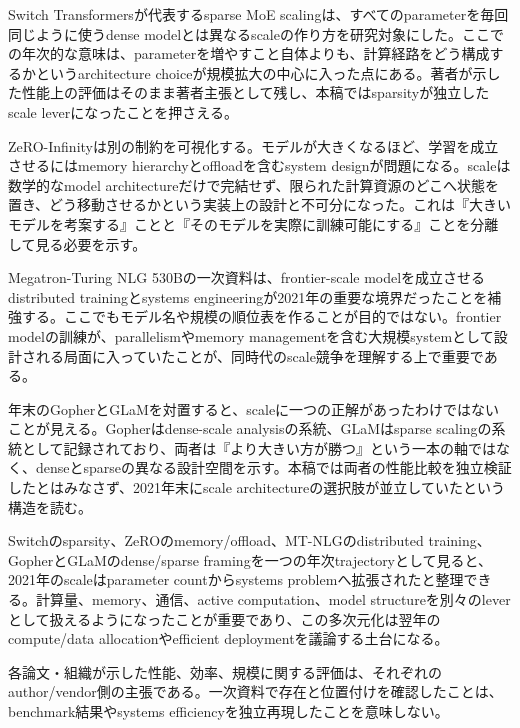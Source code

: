
Switch Transformersが代表するsparse MoE scalingは、すべてのparameterを毎回同じように使うdense modelとは異なるscaleの作り方を研究対象にした。ここでの年次的な意味は、parameterを増やすこと自体よりも、計算経路をどう構成するかというarchitecture choiceが規模拡大の中心に入った点にある。著者が示した性能上の評価はそのまま著者主張として残し、本稿ではsparsityが独立したscale leverになったことを押さえる。\autocite{src-7fa5b597ba1f}


ZeRO-Infinityは別の制約を可視化する。モデルが大きくなるほど、学習を成立させるにはmemory hierarchyとoffloadを含むsystem designが問題になる。scaleは数学的なmodel architectureだけで完結せず、限られた計算資源のどこへ状態を置き、どう移動させるかという実装上の設計と不可分になった。これは『大きいモデルを考案する』ことと『そのモデルを実際に訓練可能にする』ことを分離して見る必要を示す。\autocite{src-7b8be93e524d}


Megatron-Turing NLG 530Bの一次資料は、frontier-scale modelを成立させるdistributed trainingとsystems engineeringが2021年の重要な境界だったことを補強する。ここでもモデル名や規模の順位表を作ることが目的ではない。frontier modelの訓練が、parallelismやmemory managementを含む大規模systemとして設計される局面に入っていたことが、同時代のscale競争を理解する上で重要である。\autocite{src-b307b4b82867}


年末のGopherとGLaMを対置すると、scaleに一つの正解があったわけではないことが見える。Gopherはdense-scale analysisの系統、GLaMはsparse scalingの系統として記録されており、両者は『より大きい方が勝つ』という一本の軸ではなく、denseとsparseの異なる設計空間を示す。本稿では両者の性能比較を独立検証したとはみなさず、2021年末にscale architectureの選択肢が並立していたという構造を読む。\autocite{src-0028da50cfe5,src-7652e568e428,src-d15ca2441916}


Switchのsparsity、ZeROのmemory/offload、MT-NLGのdistributed training、GopherとGLaMのdense/sparse framingを一つの年次trajectoryとして見ると、2021年のscaleはparameter countからsystems problemへ拡張されたと整理できる。計算量、memory、通信、active computation、model structureを別々のleverとして扱えるようになったことが重要であり、この多次元化は翌年のcompute/data allocationやefficient deploymentを議論する土台になる。\autocite{src-0028da50cfe5,src-7652e568e428,src-7b8be93e524d,src-7fa5b597ba1f,src-b307b4b82867,src-d15ca2441916}


\begin{claimboundary}
各論文・組織が示した性能、効率、規模に関する評価は、それぞれのauthor/vendor側の主張である。一次資料で存在と位置付けを確認したことは、benchmark結果やsystems efficiencyを独立再現したことを意味しない。\autocite{src-0028da50cfe5,src-7652e568e428,src-7b8be93e524d,src-7fa5b597ba1f,src-b307b4b82867,src-d15ca2441916}
\end{claimboundary}
